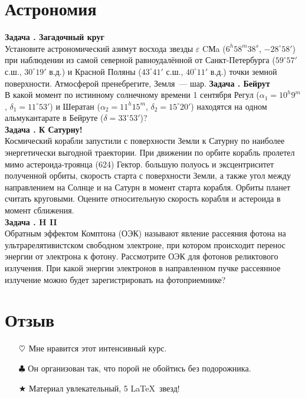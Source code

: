 \documentclass[11pt]{article}
\newcounter{astron}[section]
\newcommand{\heart}{\ensuremath\heartsuit}
\newenvironment{astro}[1]{\textbf{\stepcounter{astron}Задача \theastron. #1 \\}}{}
\begin{document}
    \section{Астрономия}
    \begin{astro}{Загадочный круг}
        Установите астрономический азимут восхода звезды $\varepsilon$ CМa ($6^h58^m38^s$, $-28^\circ58'$) при наблюдении из самой северной равноудалённой от Санкт-Петербурга ($59^\circ57'$ с.ш., $30^\circ19'$ в.д.) и Красной Поляны ($43^\circ41'$ с.ш., $40^\circ11'$ в.д.) точки земной поверхности. Атмосферой пренебрегите, Земля~--- шар.
    \end{astro}
    \begin{astro}{Бейрут}
        В какой момент по истинному солнечному времени 1 сентября Регул ($\alpha_1 = 10^h9^m$, $\delta_1 = 11^\circ53'$) и Шератан ($\alpha_2 = 11^h15^m$, $\delta_2 = 15^\circ20'$) находятся на одном альмукантарате в Бейруте ($\delta = 33^\circ53'$)?\\
    \end{astro}
    \begin{astro}{К Сатурну!}
        Космический корабли запустили с поверхности Земли к Сатурну по наиболее энергетически выгодной траектории. При движении по орбите корабль пролетел мимо астероида-троянца (624) Гектор.
     большую полуось и эксцентриситет полученной орбиты, скорость старта с поверхности Земли, а также угол между направлением на Солнце и на Сатурн в момент старта корабля. Орбиты планет считать круговыми. Оцените относительную скорость корабля и астероида в момент сближения.\\
    \end{astro}
    \begin{astro}{H II}
        Обратным эффектом Комптона (ОЭК) называют явление рассеяния фотона на ультрарелятивистском свободном электроне, при котором происходит перенос энергии от электрона к фотону.  Рассмотрите ОЭК для фотонов реликтового излучения. При какой энергии электронов в направленном пучке рассеянное излучение можно будет зарегистрировать на фотоприемнике?
    \end{astro}

    \section{Отзыв}
    \begin{itemize}
        \item[$\heart$] Мне нравится этот интенсивный курс.
        \item[$\clubsuit$] Он организован так, что порой не обойтись без подорожника.
        \item[$\bigstar$] Материал увлекательный, 5 \LaTeX ~звезд!
    \end{itemize}
\end{document}
